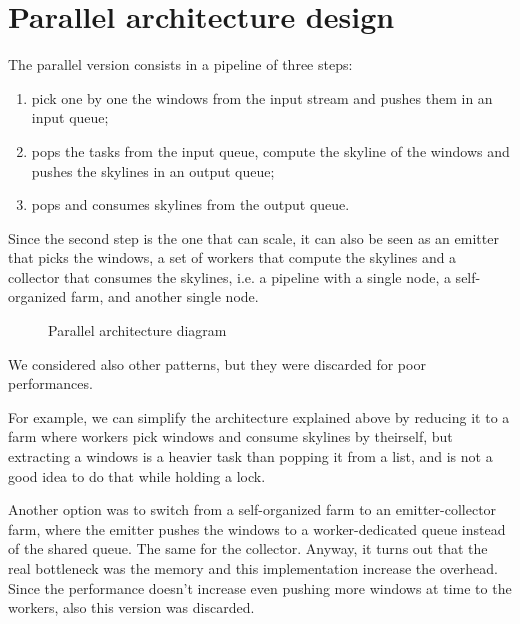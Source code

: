 \section{Parallel architecture design}

The parallel version consists in a pipeline of three steps:
\begin{enumerate}
    \item pick one by one the windows from the input stream and pushes them in an input queue;
    \item pops the tasks from the input queue, compute the skyline of the windows and pushes the skylines in an output queue;
    \item pops and consumes skylines from the output queue.
\end{enumerate}

\noindent
Since the second step is the one that can scale, it can also be seen as an emitter that picks the windows, a set of workers that compute the skylines and a collector that consumes the skylines, i.e. a pipeline with a single node, a self-organized farm, and another single node.

\bigskip\noindent
\begin{figure}[h]
    \centering
    
    \bigskip
    \caption{Parallel architecture diagram}
    \label{fig:parallel_diagram}
\end{figure}

\noindent
We considered also other patterns, but they were discarded for poor performances.

For example, we can simplify the architecture explained above by reducing it to a farm where workers pick windows and consume skylines by theirself, but extracting a windows is a heavier task than popping it from a list, and is not a good idea to do that while holding a lock.

Another option was to switch from a self-organized farm to an emitter-collector farm, where the emitter pushes the windows to a worker-dedicated queue instead of the shared queue. The same for the collector. Anyway, it turns out that the real bottleneck was the memory and this implementation increase the overhead. Since the performance doesn't increase even pushing more windows at time to the workers, also this version was discarded.